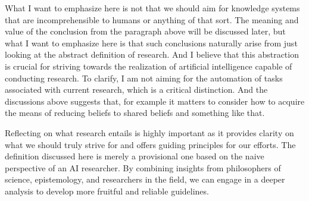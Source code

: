 \documentclass{book}
\begin{document}
What I want to emphasize here is not that we should aim for knowledge systems that are incomprehensible to humans or anything of that sort. The meaning and value of the conclusion from the paragraph above will be discussed later, but what I want to emphasize here is that such conclusions naturally arise from just looking at the abstract definition of research. And I believe that this abstraction is crucial for striving towards the realization of artificial intelligence capable of conducting research. To clarify, I am not aiming for the automation of tasks associated with current research, which is a critical distinction. And the discussions above suggests that, for example it matters to consider how to acquire the means of reducing beliefs to shared beliefs and something like that. 

Reflecting on what research entails is highly important as it provides clarity on what we should truly strive for and offers guiding principles for our efforts. The definition discussed here is merely a provisional one based on the naive perspective of an AI researcher. By combining insights from philosophers of science, epistemology, and researchers in the field, we can engage in a deeper analysis to develop more fruitful and reliable guidelines.


\end{document}
